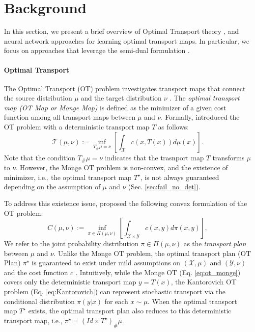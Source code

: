 \section{Background} \label{sec:background}
In this section, we present a brief overview of Optimal Transport theory \cite{villani, santambrogio}, and neural network approaches for learning optimal transport maps. In particular, we focus on approaches that leverage the semi-dual formulation \cite{otm, fanscalable}. 

\vspace{-5pt}
\paragraph{Optimal Transport}
The Optimal Transport (OT) problem investigates transport maps that connect the source distribution $\mu$ and the target distribution $\nu$ \citep{villani, santambrogio}. The \textit{optimal transport map (OT Map or Monge Map)} is defined as the minimizer of a given cost function among all transport maps between $\mu$ and $\nu$. Formally, \citet{monge1781memoire} introduced the OT problem with a deterministic transport map $T$ as follows:
\begin{equation}\label{eq:ot_monge} 
    \mathcal{T}(\mu, \nu) := \inf_{T_\# \mu = \nu}  \left[ \int_{\mathcal{X} } c(x,T(x)) d \mu (x) \right].
\end{equation}
Note that the condition $T_\# \mu = \nu$ indicates that the trasnport map $T$ transforms $\mu$ to $\nu$. However, the Monge OT problem is non-convex, and the existence of minimizer, i.e., the optimal transport map $T^{\star}$, is not always guaranteed depending on the assumption of $\mu$ and $\nu$ (Sec. \ref{sec:fail_no_det}). 

To address this existence issue, \citet{Kantorovich1948} proposed the following convex formulation of the OT problem:
\begin{equation} \label{eq:Kantorovich}
    C(\mu,\nu):=\inf_{\pi \in \Pi(\mu, \nu)} \left[ \int_{\mathcal{X}\times \mathcal{Y}} c(x,y) d\pi(x,y) \right],
\end{equation}
We refer to the joint probability distribution $\pi \in \Pi(\mu, \nu)$ as the \textit{transport plan} between $\mu$ and $\nu$. Unlike the Monge OT problem, the optimal transport plan (OT Plan) $\pi^{\star}$ is guaranteed to exist under mild assumptions on $(\mathcal{X}, \mu)$  and $(\mathcal{Y}, \nu)$ and the cost function $c$ \citep{villani}. Intuitively, while the Monge OT (Eq. \ref{eq:ot_monge}) covers only the deterministic transport map $y=T(x)$, the Kantorovich OT problem (Eq. \ref{eq:Kantorovich}) can represent stochastic transport via the conditional distribution $\pi (y | x)$ for each $x \sim \mu$. When the optimal transport map $T^{\star}$ exists, the optimal transport plan also reduces to this deterministic transport map, i.e., $\pi^{\star} = (Id \times T^{\star})_{\#} \mu$.


